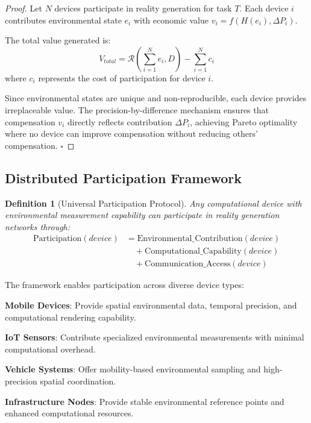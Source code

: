 \documentclass[12pt]{article}
\newtheorem{definition}{Definition}
\begin{document}
\begin{proof}
Let $N$ devices participate in reality generation for task $T$. Each device $i$ contributes environmental state $e_i$ with economic value $v_i = f(H(e_i), \Delta P_i)$.

The total value generated is:
\begin{equation}
V_{total} = \mathcal{R}\left(\sum_{i=1}^N e_i, D\right) - \sum_{i=1}^N c_i
\end{equation}
where $c_i$ represents the cost of participation for device $i$.

Since environmental states are unique and non-reproducible, each device provides irreplaceable value. The precision-by-difference mechanism ensures that compensation $v_i$ directly reflects contribution $\Delta P_i$, achieving Pareto optimality where no device can improve compensation without reducing others' compensation. $\square$
\end{proof}

\subsection{Distributed Participation Framework}

\begin{definition}[Universal Participation Protocol]
Any computational device with environmental measurement capability can participate in reality generation networks through:
\begin{align}
\text{Participation}(device) &= \text{Environmental\_Contribution}(device) \\
&\quad + \text{Computational\_Capability}(device) \\
&\quad + \text{Communication\_Access}(device)
\end{align}
\end{definition}

The framework enables participation across diverse device types:

\textbf{Mobile Devices}: Provide spatial environmental data, temporal precision, and computational rendering capability.

\textbf{IoT Sensors}: Contribute specialized environmental measurements with minimal computational overhead.

\textbf{Vehicle Systems}: Offer mobility-based environmental sampling and high-precision spatial coordination.

\textbf{Infrastructure Nodes}: Provide stable environmental reference points and enhanced computational resources.
\end{document}
